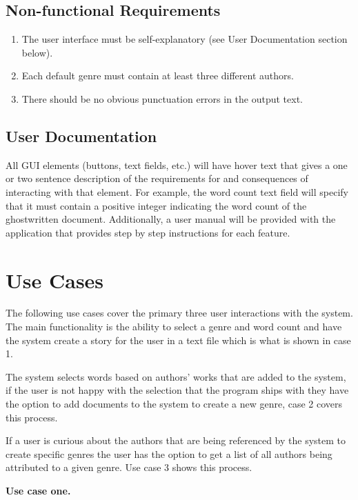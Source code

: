\documentclass[12pt]{article}
\begin{document}
\subsection{Non-functional Requirements}
\begin{enumerate}
\item The user interface must be self-explanatory (see User Documentation section below).
\item Each default genre must contain at least three different authors.
\item There should be no obvious punctuation errors in the output text.
\end{enumerate}


\subsection{User Documentation}
All GUI elements (buttons, text fields, etc.) will have hover text that gives a one or two sentence description of the requirements for and consequences of interacting with that element. For example, the word count text field will specify that it must contain a positive integer indicating the word count of the ghostwritten document. Additionally, a user manual will be provided with the application that provides step by step instructions for each feature.

\newpage

\section{Use Cases}

The following use cases cover the primary three user interactions with the system. The main functionality is the ability to select a genre and word count and have the system create a story for the user in a text file which is what is shown in case 1.

The system selects words based on authors' works that are added to the system, if the user is not happy with the selection that the program ships with they have the option to add documents to the system to create a new genre, case 2 covers this process.

If a user is curious about the authors that are being referenced by the system to create specific genres the user has the option to get a list of all authors being attributed to a given genre. Use case 3 shows this process.

{\Large\textbf{Use case one.}\par}
\end{document}
